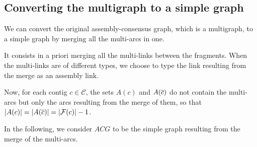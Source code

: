 \subsection{Converting the multigraph to a simple graph}

We can convert the original assembly-consensus graph, which is a multigraph, to a simple graph by merging all the multi-arcs in one.

It consists in a priori merging all the multi-links between the fragments.
When the multi-links are of different types, we choose to type the link resulting from the merge as an assembly link.

\begin{notebox}
  Now, for each contig \(c \in \mathcal{C}\), the sets \(A(c)\) and \(A(\overline{c})\) do not contain the multi-arcs but only the arcs resulting from the merge of them, so that \(|A(c)| = |A(\overline{c})| = |\mathcal{F}{}(c)| - 1\).
\end{notebox}

In the following, we consider \(ACG\) to be the simple graph resulting from the merge of the multi-arcs.
